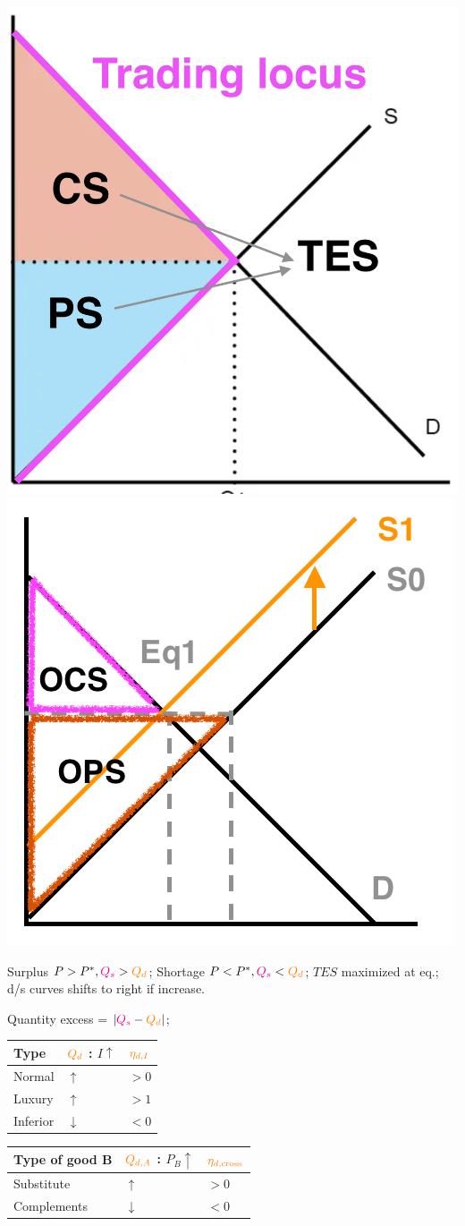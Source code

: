 \documentclass[a4paper]{article}
\begin{document}
\begin{multicols*}{3}
        \begin{minipage}{\linewidth}
            \includegraphics[width=0.3\linewidth]{./csps.png}
            \includegraphics[width=0.3\linewidth]{./csps2.jpg}
        \end{minipage}

        Surplus $P > P^*, \textcolor{magenta}{Q_s} > \textcolor{orange}{Q_d}$; Shortage $P < P^*, \textcolor{magenta}{Q_s} < \textcolor{orange}{Q_d}$; $TES$ maximized at eq.; d/s curves shifts to right if increase.

        Quantity excess = $|\textcolor{magenta}{Q_s} - \textcolor{orange}{Q_d}|$;

        \begin{minipage}{\linewidth}
            \begin{tabular}{l|l|l}
                Type     & $\textcolor{orange}{Q_d}$ : $I \uparrow$ & $\textcolor{orange}{\eta_{d,I}}$ \\
                \hline
                Normal   & $\uparrow$                               & $>0$                             \\
                Luxury   & $\uparrow$                               & $>1$                             \\
                Inferior & $\downarrow$                             & $<0$                             \\
            \end{tabular}
        \end{minipage}

        \begin{minipage}{\linewidth}
            \begin{tabular}{l|l|l}
                Type of good B & $\textcolor{orange}{Q_{d,A}}$ : $P_B \uparrow$ & $\textcolor{orange}{\eta_{d,\text{cross}}}$ \\
                \hline
                Substitute     & $\uparrow$                                     & $>0$                                        \\
                Complements    & $\downarrow$                                   & $<0$                                        \\
            \end{tabular}
        \end{minipage}


\end{multicols*}
\end{document}
